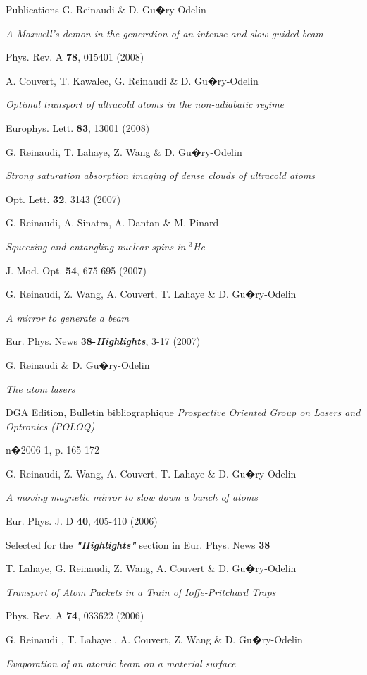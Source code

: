 \begin{rubric}{Publications}
\entry*[2008]%
G. Reinaudi \& D. Gu�ry-Odelin
\par{
\emph{A Maxwell's demon in the generation of an intense and slow guided beam}
\par{
Phys. Rev. A \textbf{78}, 015401 (2008)
}}
%
%
\entry*[2008]%
A. Couvert, T. Kawalec, G. Reinaudi \& D. Gu�ry-Odelin
\par{
\emph{Optimal transport of ultracold atoms in the non-adiabatic regime}
\par{
Europhys. Lett. \textbf{83}, 13001 (2008)
}}
%
%
\entry*[2007]%
G. Reinaudi, T. Lahaye, Z. Wang \& D. Gu�ry-Odelin
\par{
\emph{Strong saturation absorption imaging of dense clouds of ultracold atoms}
\par{
Opt. Lett. \textbf{32}, 3143  (2007)}}
%
%
\entry*[2007]%
G. Reinaudi, A. Sinatra, A. Dantan \& M. Pinard
\par{
\emph{Squeezing and entangling nuclear spins in $^3$He}
\par{
J. Mod. Opt. \textbf{54}, 675-695 (2007)
}}
%
%
\entry*[2007]%
G. Reinaudi, Z. Wang, A. Couvert, T. Lahaye \& D. Gu�ry-Odelin
\par{
\emph{A mirror to generate a beam}
\par{
Eur. Phys. News \textbf{38-\textit{Highlights}}, 3-17 (2007)
}}
%
%
\entry*[2006]%
G. Reinaudi \& D. Gu�ry-Odelin
\par{
\emph{The atom lasers}
\par{
DGA Edition, Bulletin bibliographique \textit{Prospective Oriented Group on Lasers and Optronics (POLOQ)}
\par{n�2006-1, p. 165-172}
}}
%
%
\entry*[2006]%
G. Reinaudi, Z. Wang, A. Couvert, T. Lahaye \& D. Gu�ry-Odelin
\par{
\emph{A moving magnetic mirror to slow down a bunch of atoms}
\par{
Eur. Phys. J. D \textbf{40}, 405-410 (2006)
\par{Selected for the \textit{\textbf{"Highlights"}} section in Eur. Phys. News \textbf{38}
}}}
%
%
\entry*[2006]%
T. Lahaye, G. Reinaudi, Z. Wang, A. Couvert \& D. Gu�ry-Odelin
\par{
\emph{Transport of Atom Packets in a Train of Ioffe-Pritchard Traps}
\par{
Phys. Rev. A \textbf{74}, 033622 (2006)
}}
%
%
\entry*[2006]%
G. Reinaudi , T. Lahaye , A. Couvert, Z. Wang \& D. Gu�ry-Odelin
\par{
\emph{Evaporation of an atomic beam on a material surface}
\par{
}}
\end{rubric}
